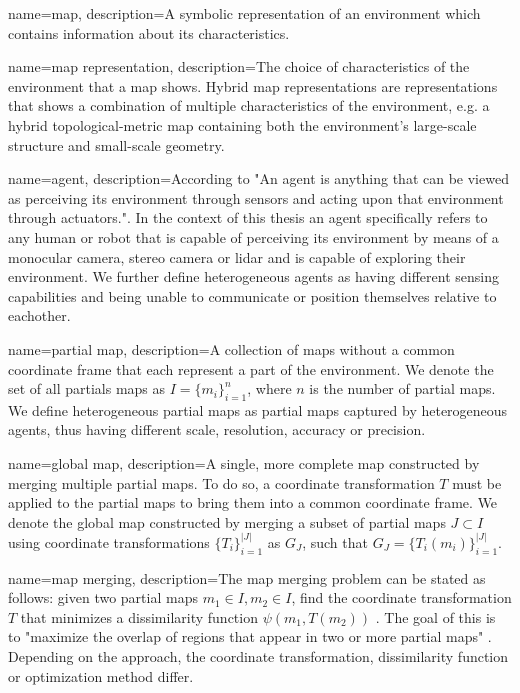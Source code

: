 

{
    name=map,
    description={A symbolic representation of an environment which contains information about its characteristics.}
}

{
    name=map representation,
    description={The choice of characteristics of the environment that a map shows. Hybrid map representations are representations that shows a combination of multiple characteristics of the environment, e.g. a hybrid topological-metric map containing both the environment's large-scale structure and small-scale geometry.}
}

{
    name=agent,
    description={According to \citet{russell_artificial_2010} "An agent is anything that can be viewed as perceiving its environment through sensors and
    acting upon that environment through actuators.". In the context of this thesis an agent specifically refers to any human or robot that is capable of perceiving its environment by means of a monocular camera, stereo camera or lidar and is capable of exploring their environment. We further define heterogeneous agents as having different sensing capabilities and being unable to communicate or position themselves relative to eachother.}
}

{
    name=partial map,
    description={A collection of maps without a common coordinate frame that each represent a part of the environment. We denote the set of all partials maps as \(I = \{m_i\}_{i=1}^n\), where \(n\) is the number of partial maps. We define heterogeneous partial maps as partial maps captured by heterogeneous agents, thus having different scale, resolution, accuracy or precision.}
}

{
    name=global map,
    description={A single, more complete map constructed by merging multiple partial maps. To do so, a coordinate transformation \(T\) must be applied to the partial maps to bring them into a common coordinate frame. We denote the global map constructed by merging a subset of partial maps \(J \subset I\) using coordinate transformations \(\{T_i\}_{i=1}^{|J|}\) as \(G_J\), such that \(G_J=\{T_i(m_i)\}_{i=1}^{|J|}\).}
}

{
    name=map merging,
    description={The map merging problem can be stated as follows: given two partial maps \(m_1\in I, m_2\in I\), find the coordinate transformation \(T\) that minimizes a dissimilarity function \(\psi(m_1,T(m_2))\) \citep{carpin_map_2005}. The goal of this is to "maximize the overlap of regions that appear in two or more partial maps" \citep{carpin_map_2005}. Depending on the approach, the coordinate transformation, dissimilarity function or optimization method differ.}
}

